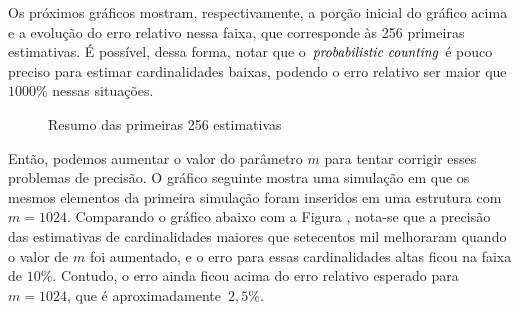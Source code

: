 \newpage
Os próximos gráficos mostram, respectivamente, a porção inicial do gráfico acima e a evolução do erro relativo nessa 
faixa, que corresponde às 256 primeiras estimativas. É possível, dessa forma, notar que o $\textit{probabilistic counting}$ é pouco preciso 
para estimar cardinalidades baixas, podendo o erro relativo ser maior que $1000\%$ nessas situações.

\begin{figure}
  \centering
  \qquad
  \caption{Resumo das primeiras 256 estimativas}
  \label{fig:pcounting:64:first}
\end{figure}

Então, podemos aumentar o valor do parâmetro $m$ para tentar corrigir esses problemas de precisão. O gráfico seguinte 
mostra uma simulação em que os mesmos elementos da primeira simulação foram inseridos em uma estrutura com $m = 1024$.
Comparando o gráfico abaixo com a Figura , nota-se que a precisão das estimativas de 
cardinalidades maiores que setecentos mil melhoraram quando o valor de $m$ foi aumentado, e o erro para essas 
cardinalidades altas ficou na faixa de $10\%$. Contudo, o erro ainda ficou acima do erro relativo esperado para 
$m = 1024$, que é aproximadamente~$2{,}5\%$.

